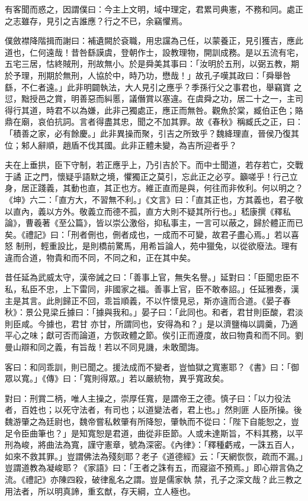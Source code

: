 \begin{pinyinscope}
 有客聞而惑之，因謂僕曰：今主上文明，域中理定，君累司典憲，不務和同。處正
 之志雖存，見引之吉誰應？行之不已，余竊懼焉。



 僕斂襟降階揖而謝曰：補遺闕於袞職，用忠讜為己任，以蒙養正，見引獲吉，應此道也，仁何遠哉！昔咎繇謨虞，登朝作士，設教理物，開訓成務。是以五流有宅，五宅三居，怙終賊刑，刑故無小。於是舜美其事曰：「汝明於五刑，以弼五教，期於予理，刑期於無刑，人協於中，時乃功，懋哉！」故孔子嘆其政曰：「舜舉咎繇，不仁者遠。」此非明闢執法，大人見引之應乎？季孫行父之事君也，舉竊寶
 之愆，黜授邑之賞，明善惡而糾慝，議僭賞以塞違。在虞舜之功，居二十之一，主司得行其道，時君不以為嫌，此非己獨處正，應正而無咎。觀魚於棠，臧伯正色；賂鼎在廟，哀伯抗詞。言者得盡其忠，聞之不加其罪。故《春秋》稱臧氏之正，曰：「積善之家，必有餘慶。」此非異操而聚，引吉之所致乎？魏絳理直，晉侯乃復其位；邾人辭順，趙盾不伐其國。此非正體未變，為吉所迎者乎？



 夫在上垂拱，臣下守制，若正應乎上，乃引吉於下。而中士聞道，若存若亡，交戰于譎
 正之門，懷疑乎語默之境，懼獨正之莫引，忘此正之必亨。籲嗟乎！行己立身，居正踐義，其動也直，其正也方。維正直而是與，何往而非攸利。何以明之？《坤》六二：「直方大，不習無不利。」《文言》曰：「直其正也，方其義也，君子敬以直內，義以方外。敬義立而德不孤，直方大則不疑其所行也。」嵇康撰《釋私論》，曹羲著《至公篇》，皆以崇公激俗，抑私事主，一言可以蔽之，歸於體正而已矣。《禮記》曰：「刑者侀也，侀者成也，一成而不可變，故君子盡心焉。」若以喜怒
 制刑，輕重設比，是則橋前驚馬，用希旨論人，苑中獵兔，以從欲廢法。理有違而合道，物貴和而不同，不同之和，正在其中矣。



 昔任延為武威太守，漢帝誡之曰：「善事上官，無失名譽。」延對曰：「臣聞忠臣不私，私臣不忠，上下雷同，非國家之福。善事上官，臣不敢奉詔。」任延雅奏，漢主是其言。此則歸正不回，乖旨順義，不以忤懷見忌，斯亦違而合道。《晏子春秋》：景公見梁丘據曰：「據與我和。」晏子曰：「此同也。和者，君甘則臣酸，君淡則臣咸。今據也，君甘
 亦甘，所謂同也，安得為和？」是以濟鹽梅以調羹，乃適平心之味；獻可否而論道，方恢政體之節。俟引正而遵度，故曰物貴和而不同。劉曼山辯和同之義，有旨哉！若以不同見譏，未敢聞誨。



 客曰：和同乖訓，則已聞之。援法成而不變者，豈恤獄之寬憲耶？《書》曰：「御眾以寬。」《傳》曰：「寬則得眾。」若以嚴統物，異乎寬政矣。



 對曰：刑賞二柄，唯人主操之，崇厚任寬，是謂帝王之德。慎子曰：「以力役法者，百姓也；以死守法者，有司也；以道變法者，君上也。」然則匪
 人臣所操。後魏游肇之為廷尉也，魏帝嘗私敕肇有所降恕，肇執而不從曰：「陛下自能恕之，豈足令臣曲筆也？」是知寬恕是君道，曲從非臣節。人或未達斯旨，不料其務，以平刑為峻，將曲法為寬，謹守憲章，號為深密。《內律》：「釋種虧戒，一誅五百人，如來不救其罪。」豈謂佛法為殘刻耶？老子《道德經》云：「天網恢恢，疏而不漏。」豈謂道教為凝峻耶？《家語》曰：「王者之誅有五，而寢盜不預焉。」即心辯言偽之流。《禮記》亦陳四殺，破律亂名之謂。豈是儒家執
 禁，孔子之深文哉？此三教之用法者，所以明真諦，重玄猷，存天綱，立人極也。




\end{pinyinscope}
